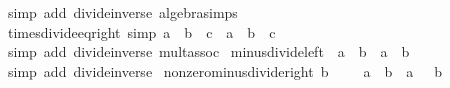 \begin{isabellebody}
%
\isadelimproof
%
\endisadelimproof
%
\isatagproof
{}\isamarkupfalse%
\ {\isacharparenleft}{\kern0pt}simp\ add{\isacharcolon}{\kern0pt}\ divide{\isacharunderscore}{\kern0pt}inverse\ algebra{\isacharunderscore}{\kern0pt}simps{\isacharparenright}{\kern0pt}%
\endisatagproof
{\isafoldproof}%
%
\isadelimproof
\isanewline
%
\endisadelimproof
\isanewline
{}\isamarkupfalse%
\ times{\isacharunderscore}{\kern0pt}divide{\isacharunderscore}{\kern0pt}eq{\isacharunderscore}{\kern0pt}right\ {\isacharbrackleft}{\kern0pt}simp{\isacharbrackright}{\kern0pt}{\isacharcolon}{\kern0pt}\ {\isachardoublequoteopen}a\ {\isacharasterisk}{\kern0pt}\ {\isacharparenleft}{\kern0pt}b\ {\isacharslash}{\kern0pt}\ c{\isacharparenright}{\kern0pt}\ {\isacharequal}{\kern0pt}\ {\isacharparenleft}{\kern0pt}a\ {\isacharasterisk}{\kern0pt}\ b{\isacharparenright}{\kern0pt}\ {\isacharslash}{\kern0pt}\ c{\isachardoublequoteclose}\isanewline
%
\isadelimproof
\ \ %
\endisadelimproof
%
\isatagproof
{}\isamarkupfalse%
\ {\isacharparenleft}{\kern0pt}simp\ add{\isacharcolon}{\kern0pt}\ divide{\isacharunderscore}{\kern0pt}inverse\ mult{\isachardot}{\kern0pt}assoc{\isacharparenright}{\kern0pt}%
\endisatagproof
{\isafoldproof}%
%
\isadelimproof
\isanewline
%
\endisadelimproof
\isanewline
{}\isamarkupfalse%
\ minus{\isacharunderscore}{\kern0pt}divide{\isacharunderscore}{\kern0pt}left{\isacharcolon}{\kern0pt}\ {\isachardoublequoteopen}{\isacharminus}{\kern0pt}\ {\isacharparenleft}{\kern0pt}a\ {\isacharslash}{\kern0pt}\ b{\isacharparenright}{\kern0pt}\ {\isacharequal}{\kern0pt}\ {\isacharparenleft}{\kern0pt}{\isacharminus}{\kern0pt}a{\isacharparenright}{\kern0pt}\ {\isacharslash}{\kern0pt}\ b{\isachardoublequoteclose}\isanewline
%
\isadelimproof
\ \ %
\endisadelimproof
%
\isatagproof
{}\isamarkupfalse%
\ {\isacharparenleft}{\kern0pt}simp\ add{\isacharcolon}{\kern0pt}\ divide{\isacharunderscore}{\kern0pt}inverse{\isacharparenright}{\kern0pt}%
\endisatagproof
{\isafoldproof}%
%
\isadelimproof
\isanewline
%
\endisadelimproof
\isanewline
{}\isamarkupfalse%
\ nonzero{\isacharunderscore}{\kern0pt}minus{\isacharunderscore}{\kern0pt}divide{\isacharunderscore}{\kern0pt}right{\isacharcolon}{\kern0pt}\ {\isachardoublequoteopen}b\ {\isasymnoteq}\ {}\ {\isasymLongrightarrow}\ {\isacharminus}{\kern0pt}\ {\isacharparenleft}{\kern0pt}a\ {\isacharslash}{\kern0pt}\ b{\isacharparenright}{\kern0pt}\ {\isacharequal}{\kern0pt}\ a\ {\isacharslash}{\kern0pt}\ {\isacharparenleft}{\kern0pt}{\isacharminus}{\kern0pt}\ b{\isacharparenright}{\kern0pt}{\isachardoublequoteclose}\isanewline

\end{isabellebody}
